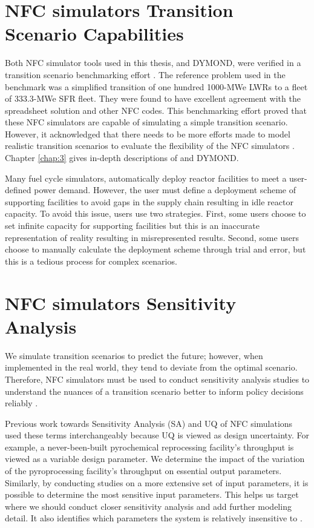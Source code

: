 \section{\gls{NFC} simulators Transition Scenario Capabilities}
Both \gls{NFC} simulator tools used in this thesis, \Cyclus and DYMOND,
were verified in a transition scenario benchmarking effort
\cite{feng_standardized_2016,bae_standardized_2019}.
The reference problem used in the benchmark was a simplified 
transition of one hundred 1000-MWe \glspl{LWR} to a fleet 
of 333.3-MWe \gls{SFR} fleet. 
They were found to have excellent agreement with the 
spreadsheet solution and other \gls{NFC} codes.  
This benchmarking effort proved that these \gls{NFC} simulators
are capable of simulating a simple transition scenario. 
However, it acknowledged that there needs to be more efforts 
made to model realistic transition scenarios to evaluate the
flexibility of the \gls{NFC} simulators \cite{feng_standardized_2016}.
Chapter \ref{chap:3} gives in-depth descriptions of \Cyclus and DYMOND.

Many fuel cycle simulators, automatically deploy reactor facilities 
to meet a user-defined power demand. 
However, the user must define a deployment scheme of 
supporting facilities to avoid gaps in the supply 
chain resulting in idle reactor capacity. 
To avoid this issue, users use two strategies. 
First, some users choose to set infinite capacity 
for supporting facilities but this is an inaccurate 
representation of reality resulting in misrepresented results. 
Second, some users choose to manually calculate the deployment 
scheme through trial and error, but this is a tedious process 
for complex scenarios. 

\section{\gls{NFC} simulators Sensitivity Analysis}
We simulate transition scenarios to predict the future; 
however, when implemented in the real world, they tend to deviate 
from the optimal scenario.
Therefore, \gls{NFC} simulators must be used to conduct
sensitivity analysis studies to understand the nuances of 
a transition scenario better to inform policy decisions reliably
\cite{passerini_systematic_2014}. 

Previous work towards Sensitivity Analysis (SA) and \gls{UQ} of 
\gls{NFC} simulations used these terms interchangeably
because \gls{UQ} is viewed as design uncertainty.
For example, a never-been-built pyrochemical reprocessing 
facility's throughput is viewed as a variable design parameter.
We determine the impact of the variation of the pyroprocessing 
facility's throughput on essential output parameters.
Similarly, by conducting studies on a more extensive set of input 
parameters, it is possible to determine the most sensitive input 
parameters.
This helps us target where we should conduct closer 
sensitivity analysis and add further modeling detail.
It also identifies which parameters the system is relatively 
insensitive to \cite{noauthor_effects_2017}. 

